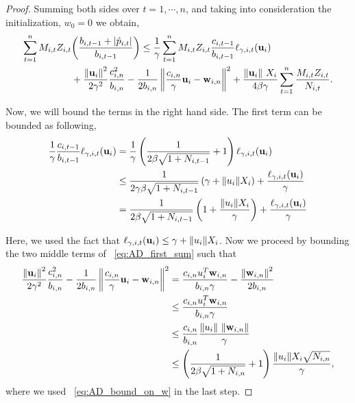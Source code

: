{\begin{proof}
\noindent
Summing  both sides over $t=1,\cdots,n$, and taking into consideration the initialization,   $w_0=0$ we obtain,
\begin{equation}
\begin{split}
\sum_{t=1}^{n}M_{i,t}Z_{i,t}&{\left({\frac{b_{i,t-1} +\left\vert{\hat{p}_{i,t}}\right\vert}{b_{i,t-1}}}\right)} \le \frac{1}{\gamma}\sum_{t=1}^{n}{M_{i,t}Z_{i,t}\frac{c_{i,t-1}}{b_{i,t-1}}\ell_{\gamma,i,t}(\mathbf{u}_i)}\\
&+\frac{\left\Vert {\mathbf{u}_i} \right\Vert^2}{2\gamma^2}\frac{c_{i,n}^2}{b_{i,n}}-\frac{1}{2b_{i,n}}\left\Vert {\frac{c_{i,n}}{\gamma} \mathbf{u}_i-\mathbf{w}_{i,n}} \right\Vert^2
+\frac{\Vert\mathbf{u}_i\Vert~ X_i}{4\beta\gamma}\sum_{t=1}^{n}{\frac{M_{i,t}Z_{i,t}}{N_{i,t}}}.
\label{eq:AD_first_sum}
\end{split}
\end{equation}

\noindent
Now, we will bound the terms in the right hand side. The first term can be bounded as following,
\begin{equation*}
\begin{split}
\frac{1}{\gamma}\frac{c_{i,t-1}}{b_{i,t-1}}\ell_{\gamma,i,t}(\mathbf{u}_i)&=\frac{1}{\gamma}\left({\frac{1}{2\beta\sqrt{1+N_{i,t-1}}}+1}\right)\ell_{\gamma,i,t}(\mathbf{u}_i)\\
&\le \frac{1}{2\gamma\beta\sqrt{1+N_{i,t-1}}}\left({\gamma+\Vert u_i\Vert X_i}\right)+\frac{\ell_{\gamma,i,t}(\mathbf{u}_i)}{\gamma}\\
&=\frac{1}{2\beta\sqrt{1+N_{i,t-1}}}\left({1+\frac{\Vert u_i\Vert X_i}{\gamma}}\right)+\frac{\ell_{\gamma,i,t}(\mathbf{u}_i)}{\gamma}
\end{split}
\end{equation*}

\noindent
Here, we used  the fact that $\ell_{\gamma,i,t}(\mathbf{u}_i)\le \gamma+\Vert u_i\Vert X_i$.
Now we proceed by bounding the two middle terms of ~\eqref{eq:AD_first_sum} such 
that
\begin{equation*}
\begin{split}
\frac{\left\Vert {\mathbf{u}_i} \right\Vert^2}{2\gamma^2}\frac{c_{i,n}^2}{b_{i,n}}-\frac{1}{2b_{i,n}}\left\Vert {\frac{c_{i,n}}{\gamma} \mathbf{u}_i-\mathbf{w}_{i,n}} \right\Vert^2
&=\frac{c_{i,n}u_i^T\mathbf{w}_{i,n}}{b_{i,n}\gamma}-\frac{\left\Vert {\mathbf{w}_{i,n}} \right\Vert^2}{2b_{i,n}}\\
&\le \frac{c_{i,n}u_i^T\mathbf{w}_{i,n}}{b_{i,n}\gamma}\\
&\le\frac{c_{i,n}}{b_{i,n}}\frac{{\Vert u_i\Vert}~{\Vert\mathbf{w}_{i,n}\Vert}}{\gamma}\\
&\le\left({\frac{1}{2\beta\sqrt{1+N_{i,n}}}+1}\right)\frac{{\Vert u_i\Vert}X_i\sqrt{N_{i,n}}}{\gamma},
\end{split}
\end{equation*}
where we used ~\eqref{eq:AD_bound_on_w} in the last step.


\end{proof}}
